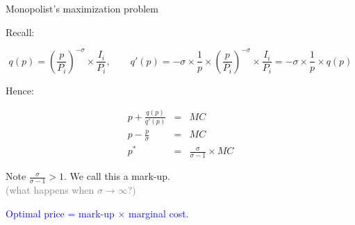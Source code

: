 \documentclass[notes,11pt, aspectratio=169, xcolor=table]{beamer}
\newcommand{\blue}[1]{\textcolor{blue}{#1}}
\newenvironment{wideitemize}{\itemize\addtolength{\itemsep}{10pt}}{\enditemize}
\begin{document}
\begin{frame}{Monopolist's maximization problem}

    \begin{wideitemize}
            \item Recall:

    \begin{equation*}
        q(p) = \left( \frac{p}{P_i} \right)^{-\sigma} \times \frac{I_i}{P_i}, \qquad q'(p) = -\sigma \times \frac{1}{p} \times \left( \frac{p}{P_i} \right)^{-\sigma} \times \frac{I_i}{P_i}  = -\sigma \times \frac{1}{p} \times q(p)
    \end{equation*}

    \item<2-> Hence: 

    \begin{eqnarray*}
        p + \frac{q(p)}{q'(p)} &=& MC \\
        p - \frac{p}{\sigma} &=& MC \\
p^* &=& \frac{\sigma}{\sigma -1}\times MC 
    \end{eqnarray*}

    \item<3-> Note $\frac{\sigma}{\sigma -1} > 1$. We call this a mark-up. \\
    \qquad \textcolor{gray}{(what happens when $\sigma \to \infty$?)}
    \item<4-> \blue{Optimal price = mark-up $\times$ marginal cost.}

    
    \end{wideitemize}
\end{frame}
\end{document}
